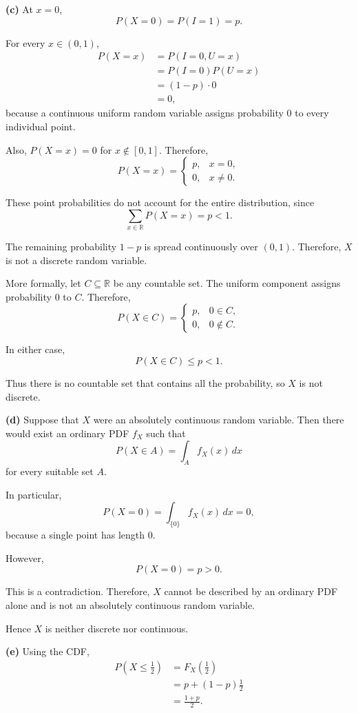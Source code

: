 \documentclass[11pt]{article}
\begin{document}
\begin{solutionbox}
\textbf{(c)} At \(x=0\),
\[
P(X=0)=P(I=1)=p.
\]

For every \(x\in(0,1)\),
\[
\begin{aligned}
P(X=x)
&=P(I=0,U=x)\\
&=P(I=0)P(U=x)\\
&=(1-p)\cdot0\\
&=0,
\end{aligned}
\]
because a continuous uniform random variable assigns probability \(0\) to
every individual point.

Also, \(P(X=x)=0\) for \(x\notin[0,1]\). Therefore,
\[
\boxed{
P(X=x)=
\begin{cases}
p, & x=0,\\[1mm]
0, & x\neq0.
\end{cases}}
\]

These point probabilities do not account for the entire distribution, since
\[
\sum_{x\in\mathbb R}P(X=x)=p<1.
\]

The remaining probability \(1-p\) is spread continuously over \((0,1)\).
Therefore, \(X\) is not a discrete random variable.

More formally, let \(C\subseteq\mathbb R\) be any countable set. The uniform
component assigns probability \(0\) to \(C\). Therefore,
\[
P(X\in C)
=
\begin{cases}
p, & 0\in C,\\
0, & 0\notin C.
\end{cases}
\]

In either case,
\[
P(X\in C)\leq p<1.
\]

Thus there is no countable set that contains all the probability, so \(X\) is
not discrete.

\textbf{(d)} Suppose that \(X\) were an absolutely continuous random variable.
Then there would exist an ordinary PDF \(f_X\) such that
\[
P(X\in A)=\int_A f_X(x)\,dx
\]
for every suitable set \(A\).

In particular,
\[
P(X=0)
=
\int_{\{0\}}f_X(x)\,dx
=
0,
\]
because a single point has length \(0\).

However,
\[
P(X=0)=p>0.
\]

This is a contradiction. Therefore, \(X\) cannot be described by an ordinary
PDF alone and is not an absolutely continuous random variable.

Hence \(X\) is neither discrete nor continuous.

\textbf{(e)} Using the CDF,
\[
\begin{aligned}
P\left(X\leq\frac12\right)
&=F_X\left(\frac12\right)\\
&=p+(1-p)\frac12\\
&=\boxed{\frac{1+p}{2}}.
\end{aligned}
\]


\end{solutionbox}
\end{document}
